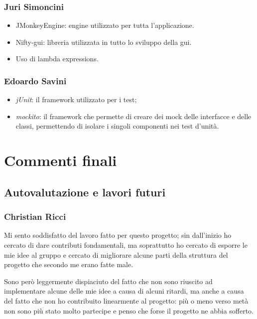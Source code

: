 \documentclass[a4paper,12pt]{report}
\begin{document}
\subsection{Juri Simoncini}

\begin{itemize}
\item JMonkeyEngine: engine utilizzato per tutta l'applicazione.
\item Nifty-gui: libreria utilizzata in tutto lo sviluppo della gui.
\item Uso di lambda expressions.
\end{itemize}

\subsection{Edoardo Savini}

\begin{itemize}
    \item \emph{jUnit}: il framework utilizzato per i test;
    \item \emph{mockito}: il framework che permette di creare dei mock delle interfacce e delle classi, permettendo di isolare i singoli componenti nei test d'unità.
\end{itemize}

\chapter{Commenti finali}

\section{Autovalutazione e lavori futuri}

\subsection{Christian Ricci}

Mi sento soddisfatto del lavoro fatto per questo progetto; sin dall'inizio ho cercato di dare contributi fondamentali, ma soprattutto ho cercato di esporre le mie idee al gruppo e cercato di migliorare alcune parti della struttura del progetto che secondo me erano fatte male.

Sono però leggermente dispiaciuto del fatto che non sono riuscito ad implementare alcune delle mie idee a causa di alcuni ritardi, ma anche a causa del fatto che non ho contribuito linearmente al progetto: più o meno verso metà non sono più stato molto partecipe e penso che forse il progetto ne abbia sofferto.
\end{document}
